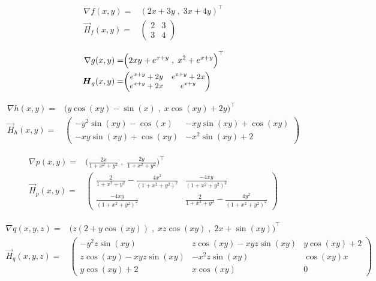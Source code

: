 {\begin{iii}
\item \begin{align*}
\nabla f(x,y)=&\left( 2x+3y\;,\;3x+4y\right)^\top\\
\vec H_f(x,y)=&\begin{pmatrix}
2 & 3 \\ 
3 & 4
\end{pmatrix}
\end{align*}
\item \begin{align*}
\nabla g(x,y)=& \Big( 2xy+e^{x+y}\;,\;x^2+e^{x+y}\Big)^\top \\
\vec H_g(x,y)=& \small{\begin{pmatrix}
e^{x+y}+2y &e^{x+y}+2x \\ 
e^{x+y}+2x&e^{x+y}
\end{pmatrix}}
\end{align*}
\item \begin{align*}
\nabla h(x,y)=&\Big( y \cos(xy)-\sin(x)\;,\;x \cos(xy)+2y\Big)^\top\\
\vec H_h(x,y)=&\begin{pmatrix}
-y^2 \sin(xy)-\cos(x) & -xy\sin(xy)+\cos(xy) \\ 
-xy\sin(xy)+\cos(xy) & -x^2 \sin(xy)+2
\end{pmatrix}
\end{align*}
\item \begin{align*}
\nabla p(x,y)=&\big(\frac{2x}{1+x^2+y^2}\;,\; \frac{2y}{1+x^2+y^2}\big)^\top\\
\vec H_p(x,y)=&
\begin{pmatrix}
\frac{2}{1+x^2+y^2}-\frac{4x^2}{(1+x^2+y^2)^2} & \frac{-4xy}{(1+x^2+y^2)^2}  \\ 
\frac{-4xy}{(1+x^2+y^2)^2} & \frac{2}{1+x^2+y^2}-\frac{4y^2}{(1+x^2+y^2)^2}
\end{pmatrix}
\end{align*}
\item \begin{align*}
\nabla q(x,y,z) =&\big(z(2+y\cos(xy))\;,\; xz\cos(xy)\;,\; 2x+\sin(xy)\big)^\top\\
\vec H_q(x,y,z) =&\begin{pmatrix}
-y^2z\sin(xy) & z\cos(xy)-xyz\sin(xy) & y\cos(xy)+2 \\
z\cos(xy)-xyz\sin(xy)  & -x^2z\sin(xy) & \cos(xy)x \\
y\cos(xy)+2 & x\cos(xy) & 0 
\end{pmatrix}
\end{align*}
\end{iii}
}

% 

